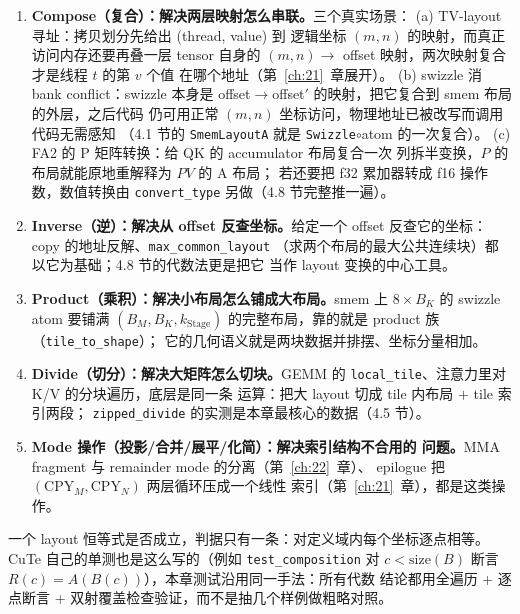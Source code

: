 \begin{enumerate}
  \item \textbf{Compose（复合）：解决两层映射怎么串联。}三个真实场景：
        (a) TV-layout 寻址：拷贝划分先给出 (thread, value) 到
        逻辑坐标 $(m,n)$ 的映射，而真正访问内存还要再叠一层 tensor 自身的
        $(m,n)\to$ offset 映射，两次映射复合才是线程 $t$ 的第 $v$ 个值
        在哪个地址（第~\ref{ch:21}~章展开）。
        (b) swizzle 消 bank conflict：swizzle 本身是
        offset$\to$offset$'$ 的映射，把它复合到 smem 布局的外层，之后代码
        仍可用正常 $(m,n)$ 坐标访问，物理地址已被改写而调用代码无需感知
        （4.1 节的 \texttt{SmemLayoutA} 就是 \texttt{Swizzle}$\circ$atom
        的一次复合）。
        (c) FA2 的 P 矩阵转换：给 QK 的 accumulator 布局复合一次
        列拆半变换，$P$ 的布局就能原地重解释为 $PV$ 的 A 布局；
        若还要把 f32 累加器转成 f16 操作数，数值转换由
        \texttt{convert\_type} 另做（4.8 节完整推一遍）。
  \item \textbf{Inverse（逆）：解决从 offset 反查坐标。}给定一个 offset
        反查它的坐标：copy 的地址反解、\texttt{max\_\allowbreak{}common\_\allowbreak{}layout}
        （求两个布局的最大公共连续块）都以它为基础；4.8 节的代数法更是把它
        当作 layout 变换的中心工具。
  \item \textbf{Product（乘积）：解决小布局怎么铺成大布局。}\allowbreak{}smem 上
        $8\times B_K$ 的 swizzle atom 要铺满 $(B_M,B_K,k_{\mathrm{Stage}})$
        的完整布局，靠的就是 product 族（\texttt{tile\_\allowbreak{}to\_\allowbreak{}shape}）；
        它的几何语义就是两块数据并排摆、坐标分量相加。
  \item \textbf{Divide（切分）：解决大矩阵怎么切块。}\allowbreak{}GEMM 的
        \texttt{local\_tile}、注意力里对 K/V 的分块遍历，底层是同一条
        运算：把大 layout 切成 tile 内布局 $+$ tile 索引两段；
        \texttt{zipped\_\allowbreak{}divide} 的实测是本章最核心的数据（4.5 节）。
  \item \textbf{Mode 操作（投影/合并/展平/化简）：解决索引结构不合用的
        问题。}\allowbreak{}MMA fragment 与 remainder mode 的分离（第~\ref{ch:22}~章）、
        epilogue 把 $(\mathrm{CPY}_M,\mathrm{CPY}_N)$ 两层循环压成一个线性
        索引（第~\ref{ch:21}~章），都是这类操作。
\end{enumerate}

一个 layout 恒等式是否成立，判据只有一条：对定义域内每个坐标逐点相等。
CuTe 自己的单测也是这么写的（例如 \texttt{test\_\allowbreak{}composition} 对
$c<\mathrm{size}(B)$ 断言 $R(c)=A(B(c))$），本章测试沿用同一手法：所有代数
结论都用全遍历 + 逐点断言 + 双射覆盖检查验证，而不是抽几个样例做粗略对照。

